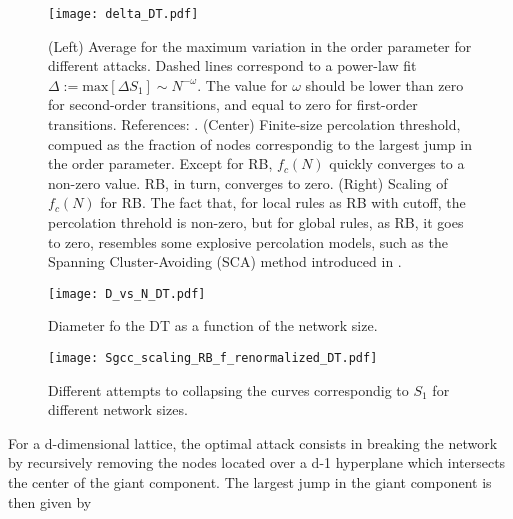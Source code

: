 \documentclass{article}
\begin{document}
\begin{figure}
\centering
\texttt{[image: delta\_DT.pdf]}
\caption{(Left) Average for the maximum variation in the order parameter for different attacks. Dashed lines correspond to a power-law fit $\Delta := \mathrm{max}[\Delta S_1] \sim N^{-\omega}$. The value for $\omega$ should be lower than zero for second-order transitions, and equal to zero for first-order transitions. References: \cite{Trevelyan2018DegreeInformation,Bastas2014a,Nagler2011a,Fan2020}. (Center) Finite-size percolation threshold, compued as the fraction of nodes correspondig to the largest jump in the order parameter. Except for RB, $f_c(N)$ quickly converges to a non-zero value. RB, in turn, converges to zero. (Right) Scaling of $f_c(N)$ for RB. The fact that, for local rules as RB with cutoff, the percolation threhold is non-zero, but for global rules, as RB, it goes to zero, resembles some explosive percolation models, such as the Spanning Cluster-Avoiding (SCA) method introduced in \cite{Cho2013}. }
\end{figure}

\begin{figure}
\centering
\texttt{[image: D\_vs\_N\_DT.pdf]}
\caption{Diameter fo the DT as a function of the network size.}
\end{figure}

\begin{figure}
\centering
\texttt{[image: Sgcc\_scaling\_RB\_f\_renormalized\_DT.pdf]}
\caption{Different attempts to collapsing the curves correspondig to $S_1$ for different network sizes.}
\end{figure}




For a d-dimensional lattice, the optimal attack consists in breaking the network by recursively removing the nodes located over a d-1 hyperplane which intersects the center of the giant component. The largest jump in the giant component is then given by
\end{document}
